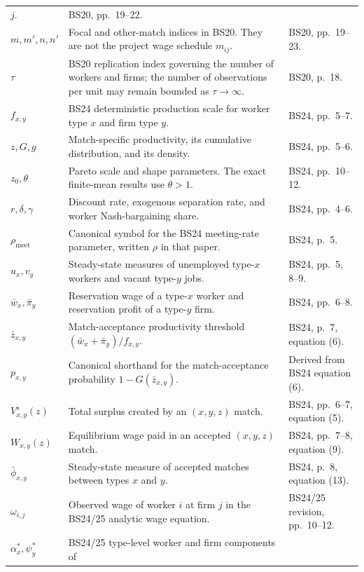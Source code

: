 \documentclass[11pt]{article}
\begin{document}
\begin{longtable}{p{}p{}p{}}
\(j\). & BS20, pp.\ 19--22. \\
\(m,m',n,n'\) & Focal and other-match indices in BS20.  They are not the
project wage schedule \(m_{ij}\). & BS20, pp.\ 19--23. \\
\(\tau\) & BS20 replication index governing the number of workers and firms;
the number of observations per unit may remain bounded as
\(\tau\to\infty\). & BS20, p.\ 18. \\
\(f_{x,y}\) & BS24 deterministic production scale for worker type \(x\) and
firm type \(y\). & BS24, pp.\ 5--7. \\
\(z,G,g\) & Match-specific productivity, its cumulative distribution, and
its density. & BS24, pp.\ 5--6. \\
\(z_0,\theta\) & Pareto scale and shape parameters.  The exact finite-mean
results use \(\theta>1\). & BS24, pp.\ 10--12. \\
\(r,\delta,\gamma\) & Discount rate, exogenous separation rate, and worker
Nash-bargaining share. & BS24, pp.\ 4--6. \\
\(\rho_{\mathrm{meet}}\) & Canonical symbol for the BS24 meeting-rate
parameter, written \(\rho\) in that paper. & BS24, p.\ 5. \\
\(u_x,v_y\) & Steady-state measures of unemployed type-\(x\) workers and
vacant type-\(y\) jobs. & BS24, pp.\ 5, 8--9. \\
\(\bar w_x,\bar\pi_y\) & Reservation wage of a type-\(x\) worker and
reservation profit of a type-\(y\) firm. & BS24, pp.\ 6--8. \\
\(\bar z_{x,y}\) & Match-acceptance productivity threshold
\((\bar w_x+\bar\pi_y)/f_{x,y}\). & BS24, p.\ 7, equation (6). \\
\(p_{x,y}\) & Canonical shorthand for the match-acceptance probability
\(1-G(\bar z_{x,y})\). & Derived from BS24 equation (6). \\
\(V^s_{x,y}(z)\) & Total surplus created by an \((x,y,z)\) match. & BS24,
pp.\ 6--7, equation (5). \\
\(W_{x,y}(z)\) & Equilibrium wage paid in an accepted
\((x,y,z)\) match. & BS24, pp.\ 7--8, equation (9). \\
\(\bar\phi_{x,y}\) & Steady-state measure of accepted matches between types
\(x\) and \(y\). & BS24, p.\ 8, equation (13). \\
\(\omega_{i,j}\) & Observed wage of worker \(i\) at firm \(j\) in the BS24/25
analytic wage equation. & BS24/25 revision, pp.\ 10--12. \\
\(\alpha_x^*,\psi_y^*\) & BS24/25 type-level worker and firm components of

\end{longtable}
\end{document}
